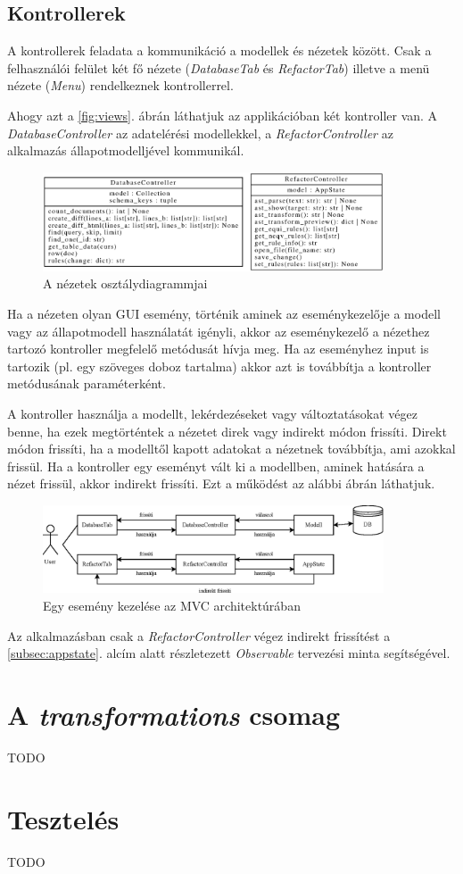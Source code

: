 \subsection{Kontrollerek}

A kontrollerek feladata a kommunikáció a modellek és nézetek között.
Csak a felhasználói felület két fő nézete (\emph{DatabaseTab} és \emph{RefactorTab})
illetve a menü nézete (\emph{Menu}) rendelkeznek kontrollerrel.

Ahogy azt a \ref{fig:views}. ábrán láthatjuk az applikációban két kontroller van.
A \emph{DatabaseController} az adatelérési modellekkel,
a \emph{RefactorController} az alkalmazás állapotmodelljével kommunikál.

\begin{figure}[H]
	\centering
	\includegraphics[width=0.9\textwidth]{images/uml/controllers.eps}
	\caption{\label{fig:controllers}A nézetek osztálydiagrammjai}
\end{figure}

Ha a nézeten olyan GUI esemény, történik aminek az eseménykezelője
a modell vagy az állapotmodell használatát igényli,
akkor az eseménykezelő a nézethez tartozó kontroller megfelelő metódusát hívja meg.
Ha az eseményhez input is tartozik (pl. egy szöveges doboz tartalma) akkor
azt is továbbítja a kontroller metódusának paraméterként.

A kontroller használja a modellt, lekérdezéseket vagy változtatásokat végez benne,
ha ezek megtörténtek a nézetet direk vagy indirekt módon frissíti.
Direkt módon frissíti, ha a modelltől kapott adatokat a nézetnek továbbítja,
ami azokkal frissül.
Ha a kontroller egy eseményt vált ki a modellben, aminek hatására a nézet frissül,
akkor indirekt frissíti.
Ezt a működést az alábbi ábrán láthatjuk.

\begin{figure}[H]
	\centering
	\includegraphics[width=0.9\textwidth]{images/figs/MVC.eps}
	\caption{Egy esemény kezelése az MVC architektúrában}
\end{figure}

Az alkalmazásban csak a \emph{RefactorController} végez indirekt frissítést a
\ref{subsec:appstate}. alcím alatt részletezett \emph{Observable} tervezési minta
segítségével. 

\pagebreak

\section{A \emph{transformations} csomag}
TODO

\pagebreak

\section{Tesztelés}

TODO
